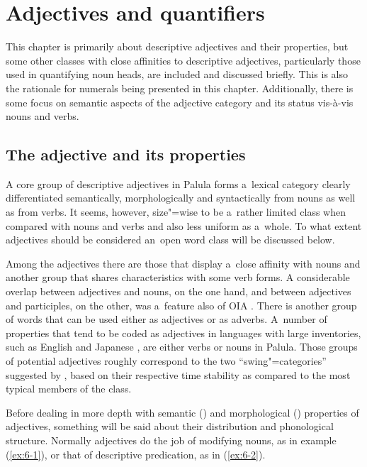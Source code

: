 \chapter{Adjectives and quantifiers}
\label{chap:6}

This chapter is primarily about descriptive adjectives and their properties, but some other classes with close affinities to descriptive adjectives, particularly those used in quantifying noun heads, are included and discussed briefly. This is also the rationale for numerals being presented in this chapter. Additionally, there is some focus on semantic aspects of the adjective category and its status vis-à-vis nouns and verbs.


\section{The adjective and its properties}
\label{sec:6-1}


A core group of descriptive adjectives in Palula forms a~lexical category clearly differentiated semantically, morphologically and syntactically from nouns as well as from verbs. It seems, however, size"=wise to be a~rather limited class when compared with nouns and verbs and also less uniform as a~whole. To what extent adjectives should be considered an~open word class will be discussed below. 



Among the adjectives there are those that display a~close affinity with nouns and another group that shares characteristics with some verb forms. A considerable overlap between adjectives and nouns, on the one hand, and between adjectives and participles, on the other, was a~feature also of OIA \citep[322, 967]{whitney1960}. There is another group of words that can be used either as adjectives or as adverbs. A~number of properties that tend to be coded as adjectives in languages with large inventories, such as English and Japanese \citep[60]{pustet2006}, are either verbs or nouns in Palula. Those groups of potential adjectives roughly correspond to the two ``swing"=categories'' suggested by \citet[321]{givon1979}, based on their respective time stability as compared to the most typical members of the class.



Before dealing in more depth with semantic () and morphological () properties of adjectives, something will be said about their distribution and phonological structure. Normally adjectives do the job of modifying nouns, as in example (\ref{ex:6-1}), or that of descriptive predication, as in (\ref{ex:6-2}).

